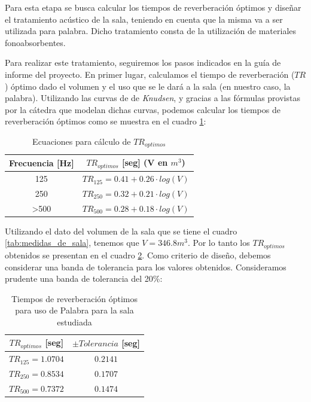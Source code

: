 \par Para esta etapa se busca calcular los tiempos de reverberación óptimos y diseñar el tratamiento acústico de la sala, teniendo en cuenta que la misma va a ser utilizada para palabra. Dicho tratamiento consta de la utilización de materiales fonoabsorbentes.\\

\par Para realizar este tratamiento, seguiremos los pasos indicados en la guía de informe del proyecto. En primer lugar, calculamos el tiempo de reverberación ($TR$) óptimo dado el volumen y el uso que se le dará a la sala (en nuestro caso, la palabra). Utilizando las curvas de  de \textit{Knudsen}, y gracias a las fórmulas provistas por la cátedra que modelan dichas curvas, podemos calcular los tiempos de reverberación óptimos como se muestra en el cuadro \ref{tab:ecuaciones_caluclo_TRoptimo}:

\begin{table}[h]
    \centering
    \begin{tabular}{|c|c|} \hline
        \textbf{Frecuencia [Hz]}  & \textbf{$TR_{optimos}$ [seg]} (V en $m^3$) \\ \hline
        125 & $TR_{125} = 0.41 + 0.26 \cdot log(V)$ \\ \hline
        250 & $TR_{250} = 0.32 + 0.21 \cdot log(V)$ \\ \hline
        >500 & $TR_{500} = 0.28 + 0.18 \cdot log(V)$ \\ \hline
    \end{tabular}
    \caption{Ecuaciones para cálculo de $TR_{optimos}$}
    \label{tab:ecuaciones_caluclo_TRoptimo}
\end{table}

\par Utilizando el dato del volumen de la sala que se tiene el cuadro \ref{tab:medidas_de_sala}, tenemos que $V = 346.8 m^3$. Por lo tanto los $TR_{optimos}$ obtenidos se presentan en el cuadro \ref{tab:TRoptimos_de_sala}. Como criterio de diseño, debemos considerar una banda de tolerancia para los valores obtenidos. Consideramos prudente una banda de tolerancia del 20\%:

\begin{table}[h]
    \centering
    \begin{tabular}{|c|c|} \hline
         $TR_{optimos}$ [seg] & $\pm Tolerancia$ [seg] \\ \hline 
         $TR_{125} = 1.0704$  & $0.2141$ \\ \hline
         $TR_{250} = 0.8534$  & $0.1707$\\ \hline
         $TR_{500} = 0.7372$  & $0.1474$ \\ \hline
    \end{tabular}
    \caption{Tiempos de reverberación óptimos para uso de Palabra para la sala estudiada}
    \label{tab:TRoptimos_de_sala}
\end{table}

